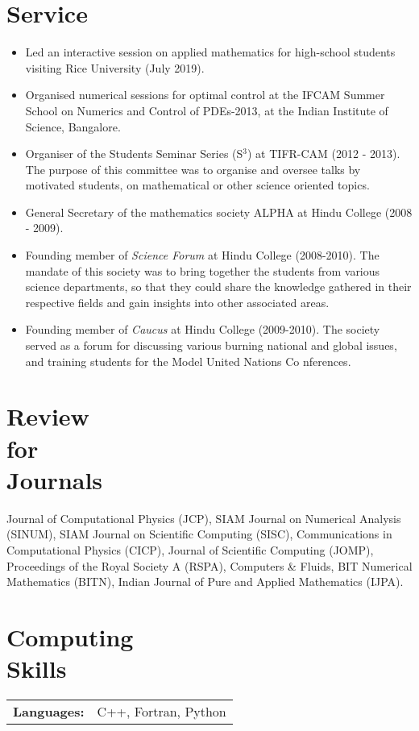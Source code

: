 \documentclass[margin]{res}
\begin{document}
\begin{resume}
\section{Service} 
               \begin{itemize} \itemsep -2pt
               \item Led an interactive session on applied mathematics for high-school students visiting Rice University (July 2019). 
                \item Organised numerical sessions for optimal control at the IFCAM Summer School on Numerics and Control of PDEs-2013, at the Indian Institute of Science, Bangalore.
               \item Organiser of the Students Seminar Series (S$^3$) at TIFR-CAM (2012 - 2013). The purpose of this committee was to organise and oversee talks by motivated students, on mathematical or other science oriented topics.   
               \item General Secretary of the mathematics society ALPHA at Hindu College (2008 - 2009). 
               \item Founding member of {\it Science Forum} at Hindu College (2008-2010). The mandate of this society was to bring together the students from various science departments, so that they could share the knowledge gathered in their respective fields and gain insights into other associated areas.
               \item Founding member of {\it Caucus} at Hindu College (2009-2010). The society served as a forum for discussing various burning national and global issues, and training students for the Model United Nations Co	 nferences.
               \end{itemize}                    
               
\section{Review \\for \\Journals}  
              Journal of Computational Physics (JCP), SIAM Journal on Numerical Analysis (SINUM), SIAM Journal on Scientific Computing (SISC), Communications in Computational Physics (CICP), Journal of Scientific Computing (JOMP), Proceedings of the Royal Society A (RSPA), Computers \& Fluids, BIT Numerical Mathematics (BITN), Indian Journal of Pure and Applied Mathematics (IJPA).
               
               
\section{Computing \\ Skills}
   \begin{tabular}{l p{3in}}
    {\bf Languages:} & C++, Fortran, Python \\


\end{tabular}
\end{resume}
\end{document}

